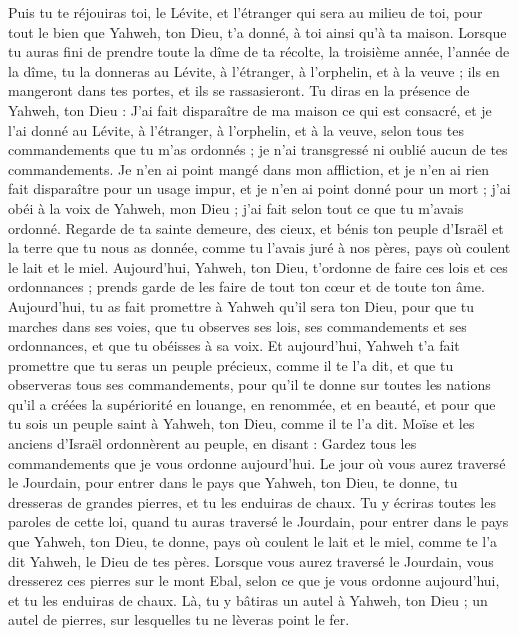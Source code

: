 \begin{multicols}{2}
Puis tu te réjouiras toi, le Lévite, et l’étranger qui sera au milieu de toi, pour tout le bien que Yahweh, ton Dieu, t'a donné, à toi ainsi qu’à ta maison.
Lorsque tu auras fini de prendre toute la dîme de ta récolte, la troisième année, l'année de la dîme, tu la donneras au Lévite, à l'étranger, à l'orphelin, et à la veuve ; ils en mangeront dans tes portes, et ils se rassasieront.
Tu diras en la présence de Yahweh, ton Dieu : J'ai fait disparaître de ma maison ce qui est consacré, et je l'ai donné au Lévite, à l'étranger, à l'orphelin, et à la veuve, selon tous tes commandements que tu m'as ordonnés ; je n'ai transgressé ni oublié aucun de tes commandements.
Je n'en ai point mangé dans mon affliction, et je n'en ai rien fait disparaître pour un usage impur, et je n'en ai point donné pour un mort ; j'ai obéi à la voix de Yahweh, mon Dieu ; j'ai fait selon tout ce que tu m'avais ordonné.
Regarde de ta sainte demeure, des cieux, et bénis ton peuple d'Israël et la terre que tu nous as donnée, comme tu l’avais juré à nos pères, pays où coulent le lait et le miel.
Aujourd'hui, Yahweh, ton Dieu, t’ordonne de faire ces lois et ces ordonnances ; prends garde de les faire de tout ton cœur et de toute ton âme.
Aujourd’hui, tu as fait promettre à Yahweh qu'il sera ton Dieu, pour que tu marches dans ses voies, que tu observes ses lois, ses commandements et ses ordonnances, et que tu obéisses à sa voix.
Et aujourd’hui, Yahweh t’a fait promettre que tu seras un peuple précieux, comme il te l’a dit, et que tu observeras tous ses commandements,
pour qu’il te donne sur toutes les nations qu'il a créées la supériorité en louange, en renommée, et en beauté, et pour que tu sois un peuple saint à Yahweh, ton Dieu, comme il te l’a dit.
\VerseOne{}Moïse et les anciens d'Israël ordonnèrent au peuple, en disant : Gardez tous les commandements que je vous ordonne aujourd'hui.
Le jour où vous aurez traversé le Jourdain, pour entrer dans le pays que Yahweh, ton Dieu, te donne, tu dresseras de grandes pierres, et tu les enduiras de chaux.
Tu y écriras toutes les paroles de cette loi, quand tu auras traversé le Jourdain, pour entrer dans le pays que Yahweh, ton Dieu, te donne, pays où coulent le lait et le miel, comme te l’a dit Yahweh, le Dieu de tes pères.
Lorsque vous aurez traversé le Jourdain, vous dresserez ces pierres sur le mont Ebal, selon ce que je vous ordonne aujourd'hui, et tu les enduiras de chaux.
Là, tu y bâtiras un autel à Yahweh, ton Dieu ; un autel de pierres, sur lesquelles tu ne lèveras point le fer.

\end{multicols}
